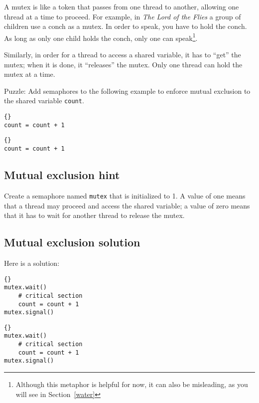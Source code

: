 \documentclass{book}
\newcommand{\clearemptydoublepage}{\newpage\cleardoublepage}
\begin{document}
A mutex is like a token that passes from one thread to another,
allowing one thread at a time to proceed.  For example, in {\em The
Lord of the Flies} a group of children use a conch as a mutex.  In
order to speak, you have to hold the conch.  As long as only one child
holds the conch, only one can speak\footnote{Although this metaphor
is helpful for now, it can also be misleading, as you will see in
Section~\ref{water}}.

Similarly, in order for a thread to access a shared variable,
it has to ``get'' the mutex; when it is done, it ``releases''
the mutex.  Only one thread can hold the mutex at a time.

Puzzle: Add semaphores to the following example to
enforce mutual exclusion to the shared variable {\tt count}.

\begin{minipage}[t]{2in}
\begin{lstlisting}[title={Thread A}]{}
count = count + 1
\end{lstlisting}
\end{minipage}
\hfill
\begin{minipage}[t]{2in}
\begin{lstlisting}[title={Thread B}]{}
count = count + 1
\end{lstlisting}
\end{minipage}


\clearemptydoublepage
\subsection{Mutual exclusion hint}

Create a semaphore named {\tt mutex} that is initialized
to 1.  A value of one means that a thread may proceed and
access the shared variable; a value of zero means that it
has to wait for another thread to release the mutex.


\clearemptydoublepage
\subsection{Mutual exclusion solution}

Here is a solution:

\begin{minipage}[t]{2in}
\begin{lstlisting}[title={Thread A}]{}
mutex.wait()
    # critical section
    count = count + 1
mutex.signal()
\end{lstlisting}
\end{minipage}
\hfill
\begin{minipage}[t]{2in}
\begin{lstlisting}[title={Thread B}]{}
mutex.wait()
    # critical section
    count = count + 1
mutex.signal()
\end{lstlisting}
\end{minipage}
\end{document}
